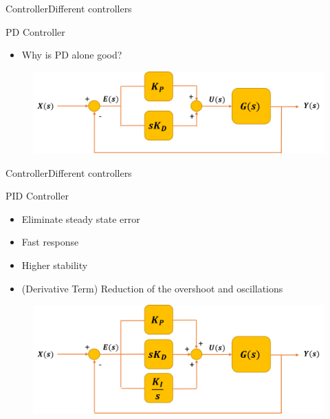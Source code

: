 \begin{frame}{Controller}{Different controllers}
  \begin{block}{PD Controller}

	  \begin{itemize}
	  	\item Why is PD alone good?
	  \end{itemize}

	  \begin{figure}
        \includegraphics[scale=0.26]{../report/figures/PD_controller.png}
      \end{figure}
  
  \end{block}
\end{frame}

\begin{frame}{Controller}{Different controllers}
  \begin{block}{PID Controller}

	  \begin{itemize}
	  	\item Eliminate steady state error
	  	\item Fast response
	  	\item Higher stability
	  	\item (Derivative Term) Reduction of the overshoot and oscillations
	  \end{itemize}

	  \begin{figure}
        \includegraphics[scale=0.26]{../report/figures/PID_controller.png}
      \end{figure}
  
  \end{block}
\end{frame}

